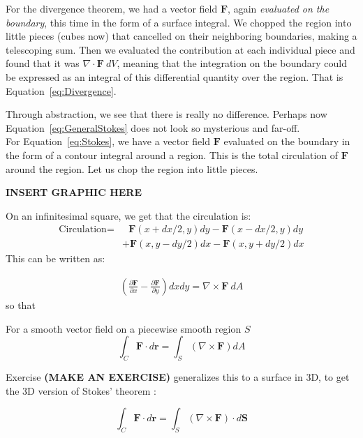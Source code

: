 \documentclass[../master.tex]{subfiles}
\begin{document}
	For the divergence theorem, we had a vector field $\mathbf F$, again \emph{evaluated on the boundary}, this time in the form of a surface integral. We chopped the region into little pieces (cubes now) that cancelled on their neighboring boundaries, making a telescoping sum. Then we evaluated the contribution at each individual piece and found that it was $\nabla \cdot \mathbf F ~ dV$, meaning that the integration on the boundary could  be expressed as an integral of this differential quantity over the region. That is Equation~\eqref{eq:Divergence}.
	
	
	Through abstraction, we see that there is really no difference. Perhaps now Equation~\eqref{eq:GeneralStokes} does not look so mysterious and far-off.\\
	
	For Equation~\eqref{eq:Stokes}, we have a vector field $\mathbf F$ evaluated on the boundary in the form of a contour integral around a region. This is the total circulation of $\mathbf{F}$ around the region. Let us chop the region into little pieces. 
	
	\textbf{INSERT GRAPHIC HERE}
	
	On an infinitesimal square, we get that the circulation is:
	\begin{align*}
		\text{Circulation} =& ~~~  \mathbf F(x+dx/2,y) dy - \mathbf F(x-dx/2,y) dy \\ &+ \mathbf F(x,y-dy/2) dx - \mathbf F(x,y+dy/2) dx
	\end{align*}
	This can be written as:
	
	\begin{align*}
		\left( \frac{\partial \mathbf F}{\partial x} - \frac{\partial \mathbf F}{\partial y} \right) dx dy = \nabla \times \mathbf F ~ dA
	\end{align*}
	so that
	\begin{theorem} For a smooth vector field on a piecewise smooth region $S$ 
		\begin{equation}
			\int_C \mathbf{F} \cdot d\mathbf r = \int_S (\nabla \times \mathbf{F}) dA
		\end{equation}
	\end{theorem}
	Exercise \textbf{(MAKE AN EXERCISE)} generalizes this to a surface in 3D, to get the 3D version of Stokes' theorem :
	
	\begin{equation}
		\int_C \mathbf{F} \cdot d\mathbf r = \int_S (\nabla \times \mathbf{F}) \cdot d\mathbf S 
	\end{equation}
	
\end{document}
